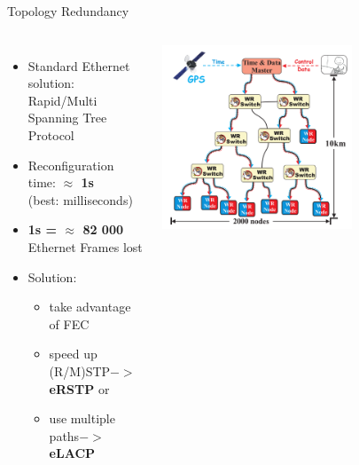 \documentclass[compress,red]{beamer}
\begin{document}
\begin{frame}{Topology Redundancy}

\begin{columns}[c]

      \begin{itemize}
	    \item Standard Ethernet solution: Rapid/Multi Spanning Tree Protocol
	    \item Reconfiguration time: \textbf{$\approx$ 1s} \\ (best: milliseconds)
	    \item \textbf{1s = $\approx$ 82 000} Ethernet Frames lost
	    \item Solution:
	    \begin{itemize}
		  \item take advantage of FEC
		  \item speed up (R/M)STP$->$\textbf{eRSTP} or
		  \item use multiple paths$->$\textbf{eLACP}
	    \end{itemize}

      \end{itemize}
% 
    \begin{center}
    \includegraphics[width=0.65\textwidth]{network/wr_network-new.pdf}
    \end{center}
\end{columns}

\end{frame}
\end{document}
